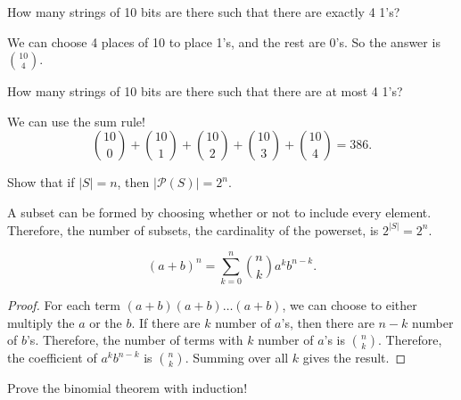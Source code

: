 
\begin{eg}
	How many strings of 10 bits are there such that there are exactly 4 1's?
\end{eg}

We can choose 4 places of 10 to place 1's, and the rest are 0's. So the answer is $\binom{10}{4}$. 

\begin{eg}
	How many strings of 10 bits are there such that there are at most 4 1's?
\end{eg}

We can use the sum rule! \[
	\binom{10}{0} + \binom{10}{1} + \binom{10}{2} + \binom{10}{3} + \binom{10}{4} = 386
.\] 

\begin{eg}
	Show that if \( |S| = n \), then \( |\mathcal{P}(S)| = 2^n \).
\end{eg}

A subset can be formed by choosing whether or not to include every element. Therefore, the number of subsets, the cardinality of the powerset, is \( 2^{|S|} = 2^n \).

\begin{theorem}
	\[
		(a+b)^n = \sum_{k=0}^n \binom{n}{k} a^k b^{n-k}
	.\] 
\end{theorem}

\begin{proof}
	For each term \( (a+b)(a+b)\ldots (a+b) \), we can choose to either multiply the \( a \) or the \( b \). If there are \( k \) number of \( a \)'s, then there are \( n-k \) number of \( b \)'s. Therefore, the number of terms with \( k \) number of \( a \)'s is \( \binom{n}{k} \). Therefore, the coefficient of \( a^k b^{n-k} \) is \( \binom{n}{k} \). Summing over all \( k \) gives the result.
\end{proof}

Prove the binomial theorem with induction!
